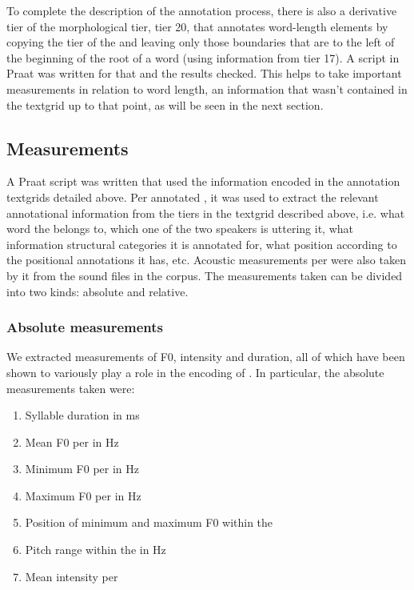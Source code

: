 \documentclass[output=paper]{LSP/langsci}
\begin{document}
To complete the description of the annotation process, there is also a derivative tier of the morphological tier, tier 20, that annotates word-length elements by copying the tier of the  and leaving only those boundaries that are to the left of the beginning of the root of a word (using information from tier 17). A script in {Praat} was written for that and the results checked. This helps to take important measurements in relation to word length, an information that wasn’t contained in the textgrid up to that point, as will be seen in the next section.       

\subsection{Measurements} 
A {Praat} script was written that used the information encoded in the annotation textgrids detailed above. Per annotated , it was used to extract the relevant annotational information from the tiers in the textgrid described above, i.e. what word the  belongs to, which one of the two speakers is uttering it, what information structural categories it is annotated for, what position according to the positional annotations it has, etc. Acoustic measurements per  were also taken by it from the sound files in the corpus. The measurements taken can be divided into two kinds: absolute and relative.

\subsubsection{Absolute measurements} 
We extracted measurements of F0, intensity and duration, all of which have been shown to variously play a role in the encoding of . In particular, the absolute measurements taken were:

\begin{enumerate}
\item  Syllable duration in ms
\item  Mean F0 per  in Hz
\item  Minimum F0 per  in Hz
\item  Maximum F0 per  in Hz
\item  Position of minimum and maximum F0 within the 
\item  Pitch range within the  in Hz
\item  Mean intensity per 
\end{enumerate}
\end{document}
